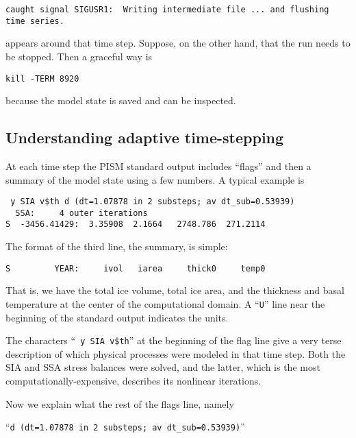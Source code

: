 \begin{verbatim}
caught signal SIGUSR1:  Writing intermediate file ... and flushing time series.
\end{verbatim}
\noindent appears around that time step.  Suppose, on the other hand, that the run needs to be stopped.  Then a graceful way is

\begin{verbatim}
kill -TERM 8920
\end{verbatim}

\noindent because the model state is saved and can be inspected.



\subsection{Understanding adaptive time-stepping} \label{subsect:adapt}

At each time step the PISM standard output includes ``flags'' and then a summary of the model state using a few numbers.  A typical example is
\small
\begin{verbatim}
 y SIA v$th d (dt=1.07878 in 2 substeps; av dt_sub=0.53939)
  SSA:     4 outer iterations
S  -3456.41429:  3.35908  2.1664   2748.786  271.2114
\end{verbatim}
\normalsize
\noindent The format of the third line, the summary, is simple:
\small
\begin{verbatim}
S         YEAR:     ivol   iarea     thick0     temp0
\end{verbatim}
\normalsize
That is, we have the total ice volume, total ice area, and the thickness and basal temperature at the center of the computational domain.  A ``\texttt{U}'' line near the beginning of the standard output indicates the units.

The characters ``\texttt{ y SIA v\$th}'' at the beginning of the flag line give a very terse description of which physical processes were modeled in that time step.  Both the SIA and SSA stress balances were solved, and the latter, which is the most computationally-expensive, describes its nonlinear iterations.

Now we explain what the rest of the flags line, namely

``\texttt{d (dt=1.07878 in 2 substeps; av dt_sub=0.53939)}''

